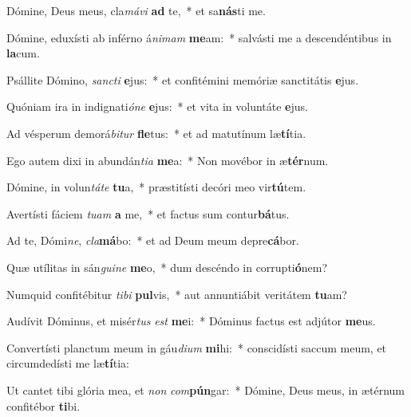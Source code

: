 \item Dómine, Deus meus, cla\textit{má}\textit{vi} \textbf{ad} te,~* et sa\textbf{nás}ti me.
\item Dómine, eduxísti ab inférno á\textit{ni}\textit{mam} \textbf{me}am:~* salvásti me a descendéntibus in \textbf{la}cum.
\item Psállite Dómino, \textit{sanc}\textit{ti} \textbf{e}jus:~* et confitémini memóriæ sanctitátis \textbf{e}jus.
\item Quóniam ira in indignati\textit{ó}\textit{ne} \textbf{e}jus:~* et vita in voluntáte \textbf{e}jus.
\item Ad vésperum demorá\textit{bi}\textit{tur} \textbf{fle}tus:~* et ad matutínum læ\textbf{tí}tia.
\item Ego autem dixi in abundán\textit{ti}\textit{a} \textbf{me}a:~* Non movébor in æ\textbf{tér}num.
\item Dómine, in volun\textit{tá}\textit{te} \textbf{tu}a,~* præstitísti decóri meo vir\textbf{tú}tem.
\item Avertísti fáciem \textit{tu}\textit{am} \textbf{a} me,~* et factus sum contur\textbf{bá}tus.
\item Ad te, Dómi\textit{ne}, \textit{cla}\textbf{má}bo:~* et ad Deum meum depre\textbf{cá}bor.
\item Quæ utílitas in sán\textit{gui}\textit{ne} \textbf{me}o,~* dum descéndo in corrupti\textbf{ó}nem?
\item Numquid confitébitur \textit{ti}\textit{bi} \textbf{pul}vis,~* aut annuntiábit veritátem \textbf{tu}am?
\item Audívit Dóminus, et misér\textit{tus} \textit{est} \textbf{me}i:~* Dóminus factus est adjútor \textbf{me}us.
\item Convertísti planctum meum in gáu\textit{di}\textit{um} \textbf{mi}hi:~* conscidísti saccum meum, et circumdedísti me læ\textbf{tí}tia:
\item Ut cantet tibi glória mea, et \textit{non} \textit{com}\textbf{pún}gar:~* Dómine, Deus meus, in ætérnum confitébor \textbf{ti}bi.
